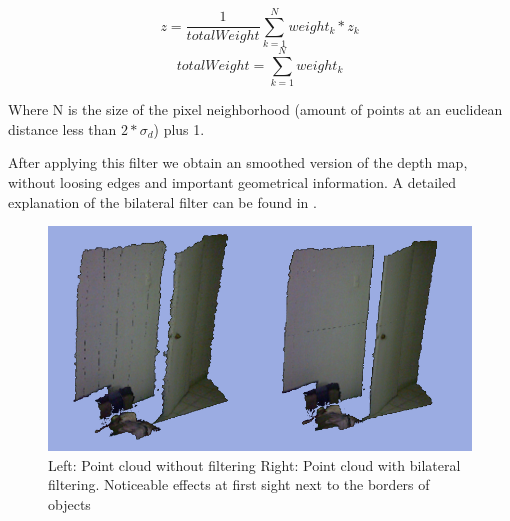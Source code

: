 $$z = \frac{1}{totalWeight}\sum\limits_{k=1}^N{weight_k*z_k}$$
$$totalWeight = \sum\limits_{k=1}^N {weight_k}$$

Where N is the size of the pixel neighborhood (amount of points at an euclidean distance less than $2*\sigma_d$)  plus 1.

After applying this filter we obtain an smoothed version of the depth map, without loosing edges and important geometrical information.
A detailed explanation of the bilateral filter can be found in \cite{TomasiBilateral}.

\begin{figure}[h!]
\begin{center}
\includegraphics[scale=0.35]{images/bilateral}
\end{center}
\caption{Left: Point cloud without filtering Right: Point cloud with bilateral filtering. Noticeable effects at first sight next to the borders of objects}
\end{figure}

